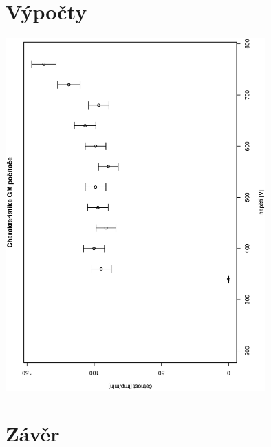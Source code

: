 \documentclass[10pt]{article}
\begin{document}
\section{Výpočty}
\begin{center}
\includegraphics[width=10cm,angle=270]{charakteristika.eps}
\end{center}

\section{Závěr} 
\end{document}
